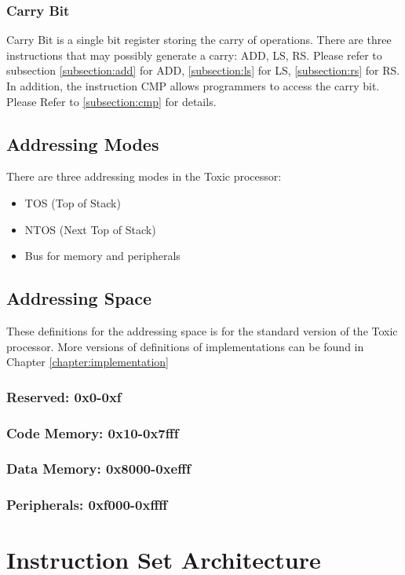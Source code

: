 \documentclass[11pt]{report}
\begin{document}
    \subsection{Carry Bit}
    Carry Bit is a single bit register storing the carry of operations. There are three instructions that may possibly 
    generate a carry: ADD, LS, RS. Please refer to subsection \ref{subsection:add} for ADD, \ref{subsection:ls} for LS, 
    \ref{subsection:rs} for RS. In addition, the instruction CMP allows programmers to access the carry bit. Please Refer to
    \ref{subsection:cmp} for details.

    \section{Addressing Modes}
    There are three addressing modes in the Toxic processor:
    \begin{itemize}
        \item TOS (Top of Stack)
        \item NTOS (Next Top of Stack)
        \item Bus for memory and peripherals
    \end{itemize}

    \section{Addressing Space}
    These definitions for the addressing space is for the standard version of the Toxic processor.
    More versions of definitions of implementations can be found in Chapter \ref{chapter:implementation}
    \label{section:addressingspace}
    \subsection{Reserved: 0x0-0xf}
    \subsection{Code Memory: 0x10-0x7fff}
    \subsection{Data Memory: 0x8000-0xefff}
    \subsection{Peripherals: 0xf000-0xffff}

    \chapter{Instruction Set Architecture}
\end{document}
